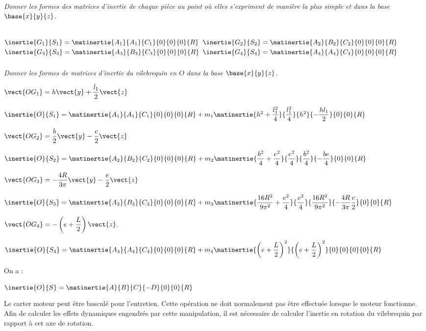 \begin{multicols}{2}
\subparagraph{}\textit{Donner les formes des matrices d’inertie de chaque pièce au point où elles s’expriment de manière la plus simple et dans la base $\base{x}{y}{z}$.}
\ifprof \begin{corrige} ~\\

$\inertie{G_1}{S_1}=\matinertie{A_1}{A_1}{C_1}{0}{0}{0}{R}$
$\inertie{G_2}{S_2}=\matinertie{A_2}{B_2}{C_2}{0}{0}{0}{R}$
$\inertie{G_3}{S_3}=\matinertie{A_3}{B_3}{C_3}{0}{0}{0}{R}$
$\inertie{G_4}{S_4}=\matinertie{A_4}{A_4}{C_4}{0}{0}{0}{R}$
\end{corrige}\else\fi

\subparagraph{}\textit{Donner les formes de matrices d’inertie du vilebrequin en $O$ dans la base $\base{x}{y}{z}$.}

\ifprof \begin{corrige}

$\vect{OG_1} = h\vect{y}+\dfrac{l_1}{2}\vect{z}$

$\inertie{O}{S_1}=\matinertie{A_1}{A_1}{C_1}{0}{0}{0}{R}
+m_1\matinertie{h^2+\dfrac{l_1^2}{4}}{\dfrac{l_1^2}{4}}{h^2}{-\dfrac{hl_1}{2}}{0}{0}{R}$

$\vect{OG_2} = \dfrac{b}{2}\vect{y}-\dfrac{e}{2}\vect{z}$

$\inertie{O}{S_2}=\matinertie{A_2}{B_2}{C_2}{0}{0}{0}{R}
+m_2\matinertie{\dfrac{b^2}{4}+\dfrac{e^2}{4}}{\dfrac{e^2}{4}}{\dfrac{b^2}{4}}{-\dfrac{be}{4}}{0}{0}{R}$

$\vect{OG_3} = -\dfrac{4R}{3\pi}  \vect{y}-\dfrac{e}{2}\vect{z}$

$\inertie{O}{S_3}=\matinertie{A_3}{B_3}{C_3}{0}{0}{0}{R}
+m_3\matinertie{\dfrac{16R^2}{9\pi^2}+\dfrac{e^2}{4}}{\dfrac{e^2}{4}}{\dfrac{16R^2}{9\pi^2}}{-\dfrac{4R}{3\pi}\dfrac{e}{2}}{0}{0}{R}$

$\vect{OG_4} = -\left(e+\dfrac{L}{2}\right)\vect{z}$.

$\inertie{O}{S_4}=\matinertie{A_4}{A_4}{C_4}{0}{0}{0}{R}
+m_4\matinertie{\left(e+\dfrac{L}{2}\right)^2}{\left(e+\dfrac{L}{2}\right)^2}{0}{0}{0}{0}{R}$

On a : 

$\inertie{O}{S}=\matinertie{A}{B}{C}{-D}{0}{0}{R}$
\end{corrige}
\else\fi

Le carter moteur peut être basculé pour l’entretien. Cette opération ne doit normalement pas être effectuée lorsque le moteur fonctionne. Afin de calculer les effets dynamiques engendrés par cette manipulation, il est nécessaire de calculer l’inertie en rotation du vilebrequin par rapport à cet axe de rotation.


\end{multicols}
